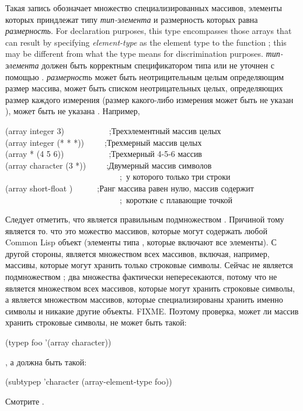 \begin{flushdesc}
\item[\cd{(array {\it тип-элемента} {\it размерность})}]
Такая запись обозначает множество специализированных массивов, элементы которых
приндлежат типу {\it тип-элемента} и размерность которых равна {\it размерность}.
For declaration purposes, this type encompasses those arrays
that can result by specifying {\it element-type} as the element type
to the function ; this may be different
from what the type means for discrimination purposes.
{\it тип-элемента} должен быть корректным спецификатором типа или не уточнен с
помощью \cd{*}.
{\it размерность} может быть неотрицительным целым определяющим размер массива,
может быть списком неотрицательных целых, определяющих размер каждого измерения
(размер какого-либо измерения может быть не указан \cd{*}), может быть не
указана \cd{*}.
Например,
\begin{lisp}
(array integer 3)~~~~~~~~~~~;{\rm Трехэлементный массив целых} \\
(array integer (* * *))~~~~~;{\rm Трехмерный массив целых} \\
(array * (4 5 6))~~~~~~~~~~~;{\rm Трехмерный 4-5-6 массив} \\
(array character (3 *))~~~~~;{\rm Двумерный массив символов} \\
~~~~~~~~~~~~~~~~~~~~~~~~~~~~;~{\rm у которого только три строки} \\
(array short-float {\emptylist})~~~~~~;{\rm Ранг массива равен нулю, массив содержит} \\
~~~~~~~~~~~~~~~~~~~~~~~~~~~~;~{\rm короткие с плавающие точкой}
\end{lisp}
Следует отметить, что  является правильным подмножеством
.
Причиной тому является то. что  это можество массивов, которые
могут содержать любой Common Lisp объект (элементы типа , которые включают
все элементы). С другой стороны,  является множеством всех
массивов, включая, например, массивы, которые могут хранить только строковые
символы. Сейчас  не является подмножеством ;
два множества фактически непересекаются, потому что  не
является множеством всех массивов, которые могут хранить строковые символы, а
является множеством массивов, которые специализированы хранить именно символы и
никакие другие объекты. FIXME. Поэтому проверка, может ли массив  хранить
строковые символы, не может быть такой:
\begin{lisp}
(typep foo '(array character))
\end{lisp}
, а должна быть такой:
\begin{lisp}
(subtypep 'character (array-element-type foo))
\end{lisp}
Смотрите .


\end{flushdesc}
